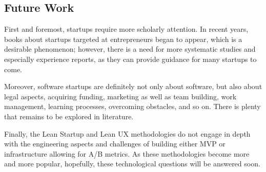 \documentclass{article}
\begin{document}
\subsection{Future Work}

First and foremost, startups require more scholarly attention. In recent years, books about startups targeted at entrepreneurs began to appear, which is a desirable phenomenon; however, there is a need for more systematic studies and especially experience reports, as they can provide guidance for many startups to come.

Moreover, software startups are definitely not only about software, but also about legal aspects, acquiring funding, marketing as well as team building, work management, learning processes, overcoming obstacles, and so on. There is plenty that remains to be explored in literature.

Finally, the Lean Startup and Lean UX methodologies do not engage in depth with the engineering aspects and challenges of building either MVP or infrastructure allowing for A/B metrics. As these methodologies become more and more popular, hopefully, these technological questions will be answered soon.

\listoffigures
 
\end{document}
